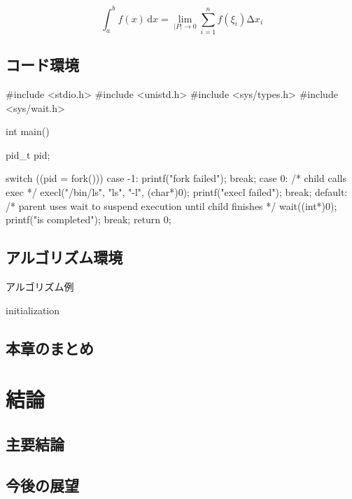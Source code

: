 \begin{equation}
  \int_{a}^b f(x)\,\mathrm{d}x=\lim_{|P|\rightarrow 0}\sum_{i=1}^n f(\xi_i)\increment x_i
\end{equation}

\section{コード環境}

\begin{codeblock}[language=C]
#include <stdio.h>
#include <unistd.h>
#include <sys/types.h>
#include <sys/wait.h>

int main() {
  pid_t pid;

  switch ((pid = fork())) {
  case -1:
    printf("fork failed\n");
    break;
  case 0:
    /* child calls exec */
    execl("/bin/ls", "ls", "-l", (char*)0);
    printf("execl failed\n");
    break;
  default:
    /* parent uses wait to suspend execution until child finishes */
    wait((int*)0);
    printf("is completed\n");
    break;
  }
  return 0;
}
\end{codeblock}

\section{アルゴリズム環境}

\begin{algorithm}[htb]
  \caption{アルゴリズム例}
  \label{algo:algorithm}
  \small
  \SetAlgoLined

  initialization\;
\end{algorithm}

\section{本章のまとめ}


\chapter{結論}

\section{主要結論}


\section{今後の展望}


